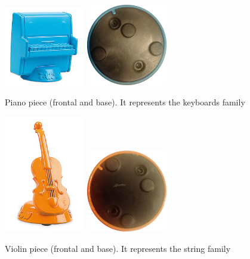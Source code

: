 \begin{figure}[ht!]
	\centering
	\includegraphics[width=100pt]{graphics/architecture/pieces/pieceKeyboards.jpg}
	\vspace{0.6cm}
	\includegraphics[width=100pt]{graphics/architecture/pieces/keyboardsBase.png}
	\caption{Piano piece (frontal and base). It represents the keyboards family}
	\label{fig:keyboardspiece}
\end{figure}

\begin{figure}[ht!]
	\centering
	\includegraphics[width=100pt]{graphics/architecture/pieces/pieceStrings.jpg}
	\vspace{0.6cm}
	\includegraphics[width=100pt]{graphics/architecture/pieces/stringsBase.png}
	\caption{Violin piece (frontal and base). It represents the string family}
	\label{fig:stringspiece}
\end{figure}


